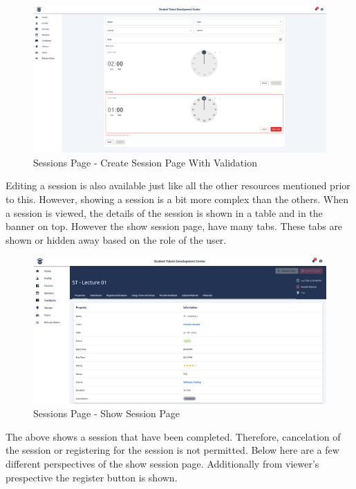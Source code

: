 \begin{justify}
    \begin{figure}[H]
        \centerline{\includegraphics[width=150mm,scale=1]{figures/implementation_and_testing/implementation/frontend/pages/Session - Create.png}}
        \caption{Sessions Page - Create Session Page With Validation}
    \end{figure}

    \vspace{0.25cm}
    \newendline Editing a session is also available just like all the other resources mentioned prior to this. However, showing a session is a bit more complex than the others. When a session is viewed, the details of the session is shown in a table and in the banner on top. However the show session page, have many tabs. These tabs are shown or hidden away based on the role of the user.

    \begin{figure}[H]
        \centerline{\includegraphics[width=150mm,scale=1]{figures/implementation_and_testing/implementation/frontend/pages/Sessions - Show.png}}
        \caption{Sessions Page - Show Session Page}
    \end{figure}

    \vspace{0.25cm}
    \newendline The above shows a session that have been completed. Therefore, cancelation of the session or registering for the session is not permitted. Below here are a few different perspectives of the show session page. Additionally from viewer's prespective the register button is shown.


\end{justify}
